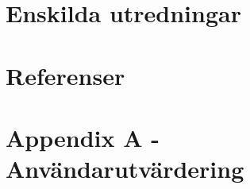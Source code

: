 \documentclass{article}
\begin{document}
\newpage
\part{Enskilda utredningar}
\renewcommand{\thesection}{\Alph{section}}	

\newpage

\newpage

\newpage

\newpage

\newpage

\newpage

\newpage

\part{Referenser}

\newpage

\part{Appendix A - Användarutvärdering}

\end{document}
